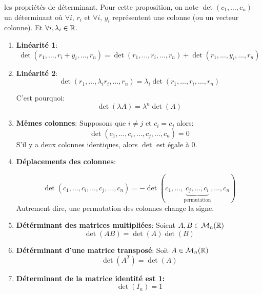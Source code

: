 \begin{prop} les propriétés de déterminant.
    Pour cette proposition, on note $\det(c_1, \ldots, c_n)$ un déterminant où $\forall i, \, r_i$ et $\forall i, \, y_i$ représentent une colonne (ou un vecteur colonne). Et $\forall i, \lambda_i \in \mathbb{R}$.
    \begin{enumerate}
        \item \textbf{Linéarité 1}:
            \[
            \det(r_1, \ldots, r_i + y_i, \ldots, r_n) = \det(r_1, \ldots, r_i, \ldots, r_n) + \det(r_1, \ldots, y_i, \ldots, r_n)
            \] 
        \item \textbf{Linéarité 2}:
            \[
            \det(r_1, \ldots, \lambda_ir_i, \ldots, r_n) = \lambda_i\det(r_1, \ldots, r_i, \ldots, r_n) 
            \] 
            \begin{note}
               C'est pourquoi:
               \[
               \det(\lambda A) = \lambda^n\det(A)
               \] 
            \end{note}
        \item \textbf{Mêmes colonnes}: Supposons que $i \neq j$ et $c_i = c_j$ alors:
             \[
            \det(c_1, \ldots, c_i, \ldots, c_j, \ldots, c_n) = 0
            \] 
            S'il y a deux colonnes identiques, alors $\det$ est égale à 0.
        \item \textbf{Déplacements des colonnes}:
            
\[
    \det(c_1, \ldots, c_i, \ldots, c_j, \ldots, c_n) 
    = -\det(c_1, \ldots, 
    \underbrace{c_j , \ldots, 
    c_i}_{\text{permutation}}, \ldots, c_n)
\]
Autrement dire, une permutation des colonnes change la signe.

\item \textbf{Détérminant des matrices multipliées}: Soient $A, B \in \mathcal{M}_n(\mathbb{R})$
    \[
        \det(AB) = \det(A)\det(B) 
    \] 

\item \textbf{Détérminant d'une matrice transposé}: Soit $A \in \mathcal{M}_n(\mathbb{R})$
    \[
        \det(A^{T}) = \det(A)
    \] 

\item \textbf{Déterminant de la matrice identité est 1:}
    \[
    \det(I_n) = 1
    \] 

\end{enumerate}
\end{prop}

